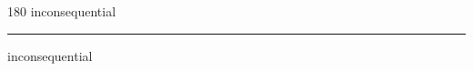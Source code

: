 
\begin{frame}
\begin{center}
\begin{turn}{180}
{\fontsize{2.5cm}{1em}\selectfont inconsequential}
\end{turn}
\vspace{1em}\par  
\hrule
\vspace{1em}\par  
{\fontsize{2.5cm}{1em}\selectfont inconsequential}
\end{center}
\end{frame}
